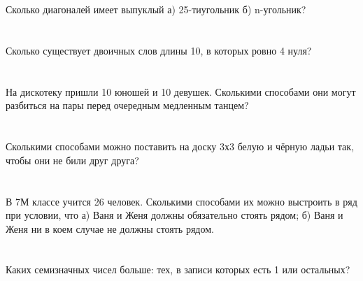 \documentclass{article}%
\begin{document}
%
\section{}%
\label{sec:}%
Сколько диагоналей имеет выпуклый а) 25-тиугольник б) n-угольник?%
%
\iffalse%
Автор: 25 школа%
Дата: 01{-}11{-}2012%
Название: None%
Подсказка: \textbackslash{}\textbackslash{}%
nan%
\fi

%
\section{}%
\label{sec:}%
Сколько существует двоичных слов длины 10, в которых ровно 4 нуля?%
%
\iffalse%
Автор: Ираклий Гагуа%
Дата: 07{-}01{-}2011%
Название: None%
Подсказка: \textbackslash{}\textbackslash{}%
nan%
\fi

%
\section{}%
\label{sec:}%
На дискотеку пришли 10 юношей и 10 девушек. Сколькими способами они могут разбиться на пары перед очередным медленным танцем?%
%
\iffalse%
Автор: 25 школа%
Дата: 01{-}07{-}2017%
Название: None%
Подсказка: \textbackslash{}\textbackslash{}%
nan%
\fi

%
\section{}%
\label{sec:}%
Сколькими способами можно поставить на доску 3х3 белую и чёрную ладьи так, чтобы они не били друг друга?%
%
\iffalse%
Автор: Ираклий Гагуа%
Дата: 07{-}01{-}2011%
Название: None%
Подсказка: \textbackslash{}\textbackslash{}%
nan%
\fi

%
\section{}%
\label{sec:}%
В 7М классе учится 26 человек. Сколькими способами их можно
выстроить в ряд при условии, что а) Ваня и Женя должны обязательно
стоять рядом; б) Ваня и Женя ни в коем случае не должны стоять рядом.%
%
\iffalse%
Автор: 25 школа%
Дата: 01{-}11{-}2012%
Название: None%
Подсказка: \textbackslash{}\textbackslash{}%
nan%
\fi

%
\section{}%
\label{sec:}%
Каких семизначных чисел больше: тех, в записи которых есть 1 или
остальных?%
%
\iffalse%
Автор: 25 школа%
Дата: 01{-}11{-}2012%
Название: None%
Подсказка: \textbackslash{}\textbackslash{}%
nan%
\fi
\end{document}
